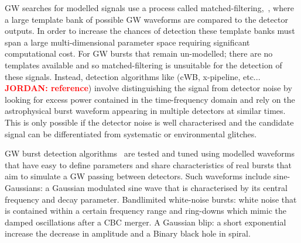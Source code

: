 \documentclass[12pt]{iopart}
\newcommand{\jordan}[1]{\textbf{\textcolor{red}{JORDAN: #1}}}
\newcommand{\chris}[1]{\textbf{\textcolor{green}{CHRIS: #1}}}
\begin{document}
%
\ac{GW} searches for modelled signals use a process called
matched-filtering,~\cite{Owen1998}, where a large template bank of possible
\ac{GW} waveforms are compared to the detector outputs. In order to increase
the chances of detection these template banks must span a large
multi-dimensional parameter space requiring
significant computational cost. For \ac{GW} bursts that remain un-modelled; there are no
templates available and so matched-filtering is unsuitable for the detection of
these signals.  Instead, detection algorithms like (cWB, x-pipeline, etc... \jordan{reference}) involve distinguishing the signal from
detector noise by looking for excess power contained in the time-frequency
domain and rely on the
astrophysical burst waveform appearing in multiple detectors at similar times.
This is only possible if the detector noise is well characterised and the
candidate signal can be differentiated from systematic or environmental
glitches. 

%
\ac{GW} burst detection algorithms~\cite{Klimenko_2008, Aso_2008} are tested
and tuned using modelled waveforms that have easy to define parameters and share characteristics of real bursts that aim to simulate a \ac{GW} passing between
detectors. Such waveforms include sine-Gaussians: a
Gaussian modulated sine wave that is characterised by its central frequency and
decay parameter. Bandlimited white-noise bursts: white noise that is contained
within a certain frequency range and ring-downs which mimic the damped
oscillations after a \ac{CBC} merger. A Gaussian blip: a short exponential increase the decrease in amplitude and a Binary black hole in spiral. 
%

\end{document}
